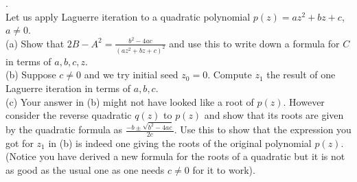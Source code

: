 \documentclass[12 pt]{article}
\begin{document}
\medskip

. \\
Let us apply Laguerre iteration to a quadratic polynomial $p(z)=az^2+bz+c$, $a \neq 0$. \\
(a) Show that $2B-A^2=\frac{b^2-4ac}{(az^2+bz+c)^2}$ and use this to write down a formula for $C$ in terms of $a,b,c,z$. \\
(b) Suppose $c \neq 0$ and we try initial seed $z_0=0$. Compute $z_1$ the result of one Laguerre iteration in terms of $a,b,c$. \\
(c) Your answer in (b) might not have looked like a root of $p(z)$. However consider the reverse quadratic $q(z)$ to $p(z)$ 
and show that its roots are given by the quadratic formula as $\frac{-b \pm \sqrt{b^2-4ac}}{2c}$. Use this to show 
that the expression you got for $z_1$ in (b) is indeed one giving the roots of the original polynomial $p(z)$. 
(Notice you have derived a new formula for the roots of a quadratic but it is not as good as the usual one as one needs 
$c \neq 0$ for it to work).
 
\end{document}
